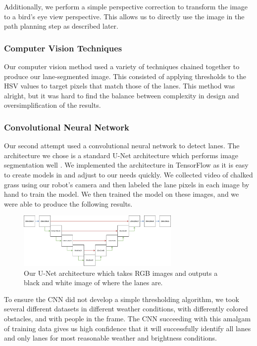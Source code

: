 Additionally, we perform a simple perspective correction to transform the image to a bird's eye view perspective. This allows us to directly use the image in the path planning step as described later.

\subsubsection{Computer Vision Techniques}

Our computer vision method used a variety of techniques chained together to produce our lane-segmented image. This consisted of applying thresholds to the HSV values to target pixels that match those of the lanes. This method was alright, but it was hard to find the balance between complexity in design and oversimplification of the results.

\subsubsection{Convolutional Neural Network}

Our second attempt used a convolutional neural network to detect lanes. The architecture we chose is a standard U-Net architecture which performs image segmentation well \cite{UNet}. We implemented the architecture in TensorFlow as it is easy to create models in and adjust to our needs quickly. We collected video of chalked grass using our robot's camera and then labeled the lane pixels in each image by hand to train the model. We then trained the model on these images, and we were able to produce the following results.

\begin{figure}[h]
    \centering
    \includegraphics[width=0.7\textwidth]{images/software/unet.png}
    \caption{Our U-Net architecture which takes RGB images and outputs a black and white image of where the lanes are.}
\end{figure}

To ensure the CNN did not develop a simple thresholding algorithm, we took several different datasets in different weather conditions, with differently colored obstacles, and with people in the frame. The CNN succeeding with this amalgam of training data gives us high confidence that it will successfully identify all lanes and only lanes for most reasonable weather and brightness conditions.

